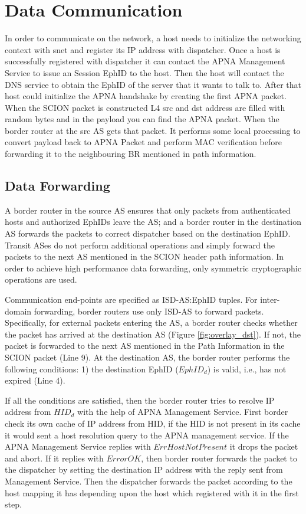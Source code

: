 \section{Data Communication}
In order to communicate on the network, a host needs to initialize the networking context with snet and register its IP address with dispatcher. Once a host is successfully registered with dispatcher it can contact the APNA Management Service to issue an Session EphID to the host. Then the host will contact the DNS service to obtain the EphID of the server that it wants to talk to. After that host could initialize the APNA handshake by creating the first APNA packet. When the SCION packet is constructed L4 src and dst address are filled with random bytes and in the payload you can find the APNA packet. When the border router at the src AS gets that packet. It performs some local processing to convert payload back to APNA Packet and perform MAC verification before forwarding it to the neighbouring BR mentioned in path information.

\subsection{Data Forwarding}
A border router in the source AS ensures that only packets from authenticated hosts and authorized EphIDs leave the AS; and a border router in the destination AS forwards the packets to correct dispatcher based on the destination EphID. Transit ASes do not perform additional operations and simply forward the packets to the next AS mentioned in the SCION header path information. In order to achieve high performance data forwarding, only symmetric cryptographic operations are used.

Communication end-points are specified as ISD-AS:EphID tuples. For inter-domain forwarding, border routers use only ISD-AS to forward packets. Specifically, for external packets entering the AS, a border router checks whether the packet has arrived at the destination AS (Figure \ref{fig:overlay_dst}). If not, the packet is forwarded to the next AS mentioned in the Path Information in the SCION packet (Line 9). At the destination AS, the border router performs the following conditions: 1) the destination EphID ($EphID_{d}$) is valid, i.e., has not expired (Line 4).

If all the conditions are satisfied, then the border router tries to resolve IP address from $HID_{d}$ with the help of APNA Management Service. First border check its own cache of IP address from HID, if the HID is not present in its cache it would sent a host resolution query to the APNA management service. If the APNA Management Service replies with $ErrHostNotPresent$ it drops the packet and abort. If it replies with $ErrorOK$, then border router forwards the packet to the dispatcher by setting the destination IP address with the reply sent from Management Service. Then the dispatcher forwards the packet according to the host mapping it has depending upon the host which registered with it in the first step.

